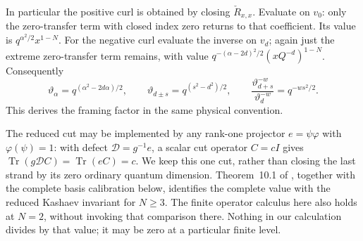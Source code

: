 \documentclass[11pt]{article}
\numberwithin{equation}{section}
\theoremstyle{definition}\newtheorem{definition}[theorem]{Definition}
\theoremstyle{remark}\newtheorem{remark}[theorem]{Remark}
\newcommand{\Tr}{\operatorname{Tr}}
\begin{document}
In particular the positive curl is obtained by closing
$\check R_{x,x}$. Evaluate on $v_0$: only the zero-transfer term
with closed index zero returns to that coefficient. Its value is
$q^{\alpha^2/2}x^{1-N}$. For the negative curl evaluate the inverse
on $v_d$; again just the extreme zero-transfer term remains, with
value $q^{-(\alpha-2d)^2/2}(xQ^{-d})^{1-N}$. Consequently
\begin{equation}\label{mt:twist}
 \vartheta_\alpha=q^{(\alpha^2-2d\alpha)/2},\qquad
 \vartheta_{d\pm s}=q^{(s^2-d^2)/2},\qquad
 \frac{\vartheta_{d+s}^{-w}}{\vartheta_d^{-w}}=q^{-ws^2/2}.
\end{equation}
This derives the framing factor in the same physical convention.

The reduced cut may be implemented by any rank-one projector
$e=\psi\varphi$ with $\varphi(\psi)=1$: with defect
$\mathcal D=g^{-1}e$, a scalar cut operator $C=cI$ gives
$\Tr(g\mathcal DC)=\Tr(eC)=c$. We keep this one cut, rather than
closing the last strand by its zero ordinary quantum dimension.
Theorem~10.1 of \cite{Finite}, together with the complete basis
calibration below, identifies the complete value with the reduced
Kashaev invariant for $N\ge3$. The finite operator calculus here also
holds at $N=2$, without invoking that comparison there. Nothing in our calculation divides by that value;
it may be zero at a particular finite level.
\end{document}
